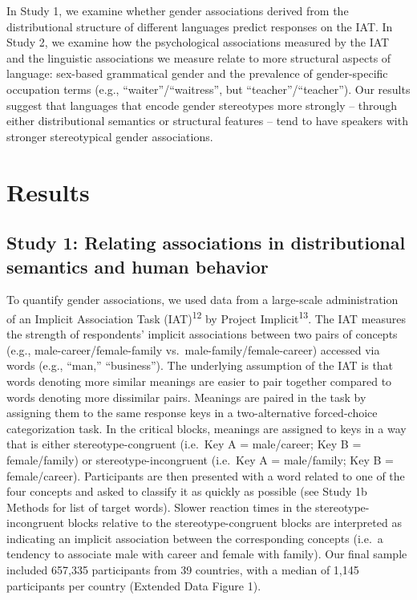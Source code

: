 \documentclass[11pt]{wlscirep}
\begin{document}
In Study 1, we examine whether gender associations derived from the distributional structure of different languages predict responses on the IAT. In Study 2, we examine how the psychological
associations measured by the IAT and the linguistic associations we measure relate
to more structural aspects of language: sex-based grammatical gender and
the prevalence of gender-specific occupation terms (e.g.,
\enquote{waiter}/\enquote{waitress}, but
\enquote{teacher}/\enquote{teacher}). Our results suggest that languages that encode gender stereotypes more strongly -- through either distributional semantics or structural features -- tend to have speakers with stronger stereotypical gender associations. 


\section*{Results}
\subsection*{Study 1: Relating associations in distributional semantics and
human
behavior}\label{study-1-relating-gender-biases-in-distributional-semantics-and-human-behavior}

To quantify gender associations, we used data from a large-scale administration of an Implicit Association Task (IAT)\textsuperscript{12}  by Project Implicit\textsuperscript{13}. The IAT measures the strength of respondents' implicit associations between two pairs of concepts (e.g., male-career/female-family vs.~male-family/female-career) accessed via
words (e.g., \enquote{man,} \enquote{business}). The underlying
assumption of the IAT is that words denoting more similar meanings
are easier to pair together compared to words denoting more dissimilar pairs. Meanings are paired in the task by assigning them to the same response
keys in a two-alternative forced-choice categorization task. In the
critical blocks, meanings are assigned to keys in a way that
is either stereotype-congruent (i.e.~Key A = male/career; Key B =
female/family) or stereotype-incongruent (i.e.~Key A = male/family; Key B =
female/career). Participants are then presented with a word related to
one of the four concepts and asked to classify it as quickly as possible
(see Study 1b Methods for list of target words). Slower reaction times
in the stereotype-incongruent blocks relative to the stereotype-congruent blocks are
interpreted as indicating an implicit association between the
corresponding concepts (i.e.~a tendency to associate male with career and
female with family). Our final sample included 657,335 participants from 39 countries, with a
median of 1,145 participants per country (Extended Data Figure 1).
\end{document}
